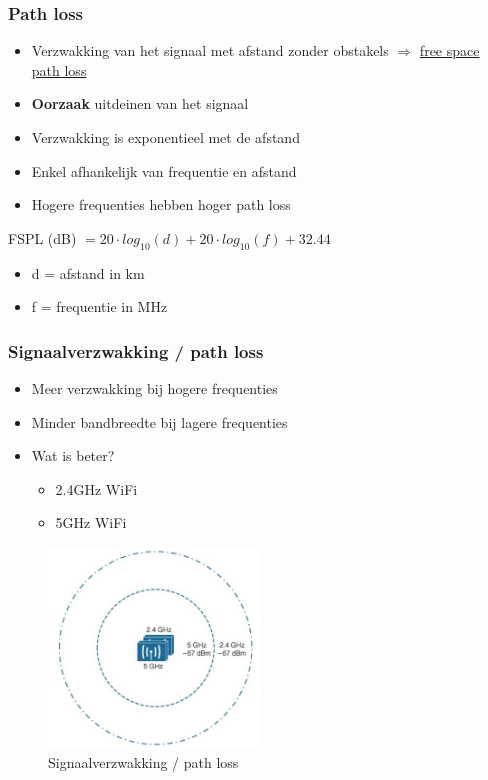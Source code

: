 \documentclass{article}
\newcommand{\bold}[1]{\textbf{#1}}
\begin{document}
\subsubsection{Path loss}
\begin{itemize}
    \item Verzwakking van het signaal met afstand zonder obstakels $\Rightarrow$ \underline{free space path loss}
    \item \bold{Oorzaak} uitdeinen van het signaal
    \item Verzwakking is exponentieel met de afstand
    \item Enkel afhankelijk van frequentie en afstand
    \item Hogere frequenties hebben hoger path loss
\end{itemize}

FSPL (dB) $= 20\cdot log_{10}(d) + 20\cdot log_{10}(f) + 32.44$
\begin{itemize}
    \item d = afstand in km
    \item f = frequentie in MHz
\end{itemize}

\subsubsection{Signaalverzwakking / path loss}
\begin{itemize}
    \item Meer verzwakking bij hogere frequenties
    \item Minder bandbreedte bij lagere frequenties
    \item Wat is beter?
    \begin{itemize}
        \item 2.4GHz WiFi
        \item 5GHz WiFi
    \end{itemize}
\end{itemize}

\begin{figure}[H]
    \centering
    \includegraphics[width=0.5\textwidth]{Screenshot_20200309_123426.png}
    \caption{Signaalverzwakking / path loss}
\end{figure}
\end{document}
